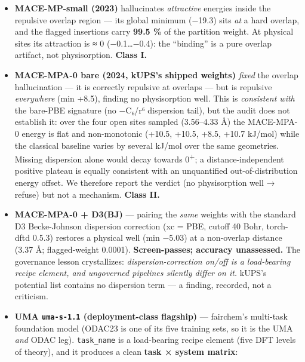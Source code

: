\begin{itemize}
\item
  \textbf{MACE-MP-small (2023)} hallucinates \emph{attractive} energies
  inside the repulsive overlap region --- its global minimum (−19.3)
  sits \emph{at} a hard overlap, and the flagged insertions carry
  \textbf{99.5 \%} of the partition weight. At physical sites its
  attraction is ≈ 0 (−0.1\ldots−0.4): the ``binding'' is a pure overlap
  artifact, not physisorption. \textbf{Class I.}
\item
  \textbf{MACE-MPA-0 bare (2024, kUPS's shipped weights)} \emph{fixed}
  the overlap hallucination --- it is correctly repulsive at overlaps
  --- but is repulsive \emph{everywhere} (min +8.5), finding no
  physisorption well. This is \emph{consistent with} the bare-PBE
  signature (no −C₆/r⁶ dispersion tail), but the audit does not
  establish it: over the four open sites sampled (3.56--4.33 Å) the
  MACE-MPA-0 energy is flat and non-monotonic (+10.5, +10.5, +8.5,
  +10.7 kJ/mol) while the classical baseline varies by several kJ/mol
  over the same geometries. Missing dispersion alone would decay
  towards 0\textsuperscript{+}; a distance-independent positive plateau
  is equally consistent with an unquantified out-of-distribution
  energy offset. We therefore report the verdict (no physisorption
  well → refuse) but not a mechanism. \textbf{Class II.}
\item
  \textbf{MACE-MPA-0 + D3(BJ)} --- pairing the \emph{same} weights with
  the standard D3 Becke-Johnson dispersion correction (xc = PBE, cutoff
  40 Bohr, torch-dftd 0.5.3) restores a physical well (min −5.03) at a
  non-overlap distance (3.37 Å; flagged-weight 0.0001). \textbf{Screen-passes; accuracy unassessed.} The
  governance lesson crystallizes: \emph{dispersion-correction on/off is
  a load-bearing recipe element, and ungoverned pipelines silently
  differ on it.} kUPS's potential list contains no dispersion term --- a
  finding, recorded, not a criticism.
\item
  \textbf{UMA \texttt{uma-s-1.1} (deployment-class flagship)} ---
  fairchem's multi-task foundation model (ODAC23 is one of its five
  training sets, so it is the UMA \emph{and} ODAC leg).
  \texttt{task\_name} is a load-bearing recipe element (five DFT levels
  of theory), and it produces a clean \textbf{task × system matrix}:


\end{itemize}
